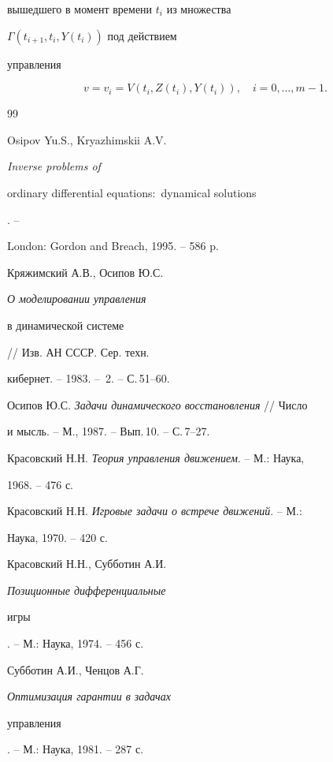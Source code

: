 вышедшего в момент времени $t_i$ из множества 


$\Gamma(t_{i+1},t_i,Y(t_i))$ под действием 


управления 


$$ 


v=v_i=V(t_i,Z(t_i),Y(t_i)),\quad i=0,\dotsc,m-1. 


$$ 


 


\begin{thebibliography}{99} 


 




Osipov Yu.S., Kryazhimskii A.V. {\em Inverse problems of 


ordinary differential equations$:$ dynamical solutions}. -- 


London: Gordon and Breach, 1995. -- 586 p. 




Кряжимский А.В., Осипов Ю.С. {\em О моделировании управления 


в динамической системе} // Изв. АН СССР. Сер. техн. 


кибернет. -- 1983. -- \No\,2. -- С.\,51--60. 




Осипов Ю.С. {\em Задачи динамического восстановления} // Число 


и мысль. -- М., 1987. -- Вып.\,10. -- С.\,7--27. 




Красовский Н.Н. {\em Теория управления движением}. -- М.: Наука, 


1968. -- 476 с. 




Красовский Н.Н. {\em Игровые задачи о встрече движений}. -- М.: 


Наука, 1970. -- 420 с. 




Красовский Н.Н., Субботин А.И. {\em Позиционные дифференциальные 


игры}. -- М.: Наука, 1974. -- 456 с. 




Субботин А.И., Ченцов А.Г. {\em Оптимизация гарантии в задачах 


управления}. -- М.: Наука, 1981. -- 287 с. 





\end{thebibliography}
